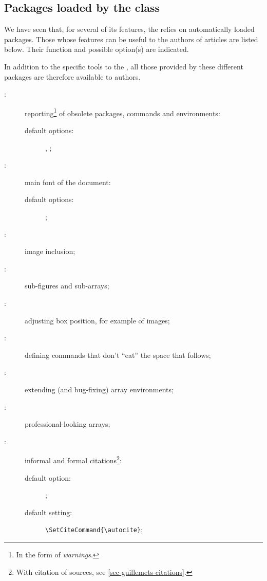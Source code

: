 \documentclass[english,nolocaltoc]{nwejmart}
\newtheorem[style=definition]{fact}
\newtheorem[title-plural=Criteria]{criterion}
\newtheorem[title=random experiment]{rexp}
\begin{document}
\subsection{Packages loaded by the class}\label{sec:packages-charges-par}

We have seen that, for several of its features, the  \nwejmauthorcl{}
relies on automatically loaded packages. Those whose features can be
useful to the authors of  \nwejm{}  articles are listed below. Their
function and possible option(s) are indicated.

In addition to the specific tools to the \nwejmauthorcl, all those
provided by these different packages are therefore available to \nwejm{}
authors.

\begin{description}
\item[:] reporting\footnote{In the form of  \emph{warnings}.} of obsolete  packages, commands and environments:
  \begin{description}
  \item[default options:] , ;
  \end{description}
\item[ :] main font of the document:
  \begin{description}
  \item[default options:] ;
  \end{description}
\item[:] image inclusion;
\item[:] sub-figures and sub-arrays;
\item[:] adjusting box position, for example of images;
\item[:] defining commands that don't  \enquote{eat}
  the space that follows;
\item[:] extending (and bug-fixing) array  environments;
\item[:] professional-looking arrays;
\item[:] informal and formal citations\footnote{With
     citation of sources,
    see \vref{sec-guillemets-citations}.}:
    \begin{description}
    \item[default  option:] ;
    \item[default setting:]
      \lstinline[alsolanguage={[csquotes]TeX},alsolanguage={[biblatex]TeX}]×\SetCiteCommand{\autocite}×;

\end{description}
\end{description}
\end{document}

